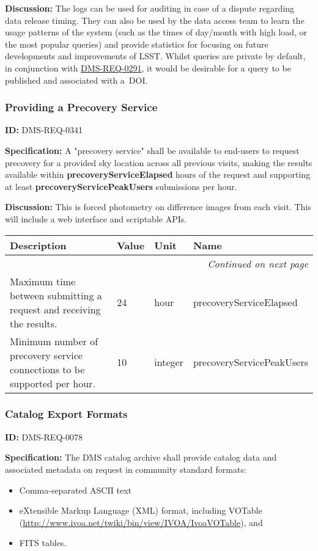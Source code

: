 \documentclass[SE,toc,lsstdraft]{lsstdoc}
\makeatletter
\newcommand{\paramname}[1]{\hspace{0pt}#1}
\newcommand{\unitname}[1]{\hspace{0pt}#1}
\newenvironment{parameters}[0]{%
\setlength\LTleft{0pt}
\setlength\LTright{\fill}
\begin{small}
\begin{longtable}[]{|p{0.5\textwidth}|l|p{0.6in}|p{1.74in}@{}|}

\hline \textbf{Description} & \textbf{Value} & \textbf{Unit} & \textbf{Name} \\ \hline
\endhead

\hline \multicolumn{4}{r}{\emph{Continued on next page}} \\
\endfoot

\hline\hline
\endlastfoot
}{%
\hline
\end{longtable}
\end{small}
}
\makeatother
\begin{document}
    \textbf{Discussion: }The logs can be used for auditing in case of a dispute regarding data release timing. They can also be used by the data access team to learn the usage patterns of the system (such as the times of day/month with high load, or the most popular queries) and provide statistics for focusing on future developments and improvements of LSST. Whilst queries are private by default, in conjunction with \hyperref[DMS-REQ-0291]{DMS-REQ-0291}, it would be desirable for a query to be published and associated with a DOI.




\subsubsection{Providing a Precovery Service}

\label{DMS-REQ-0341}
\textbf{ID:} DMS-REQ-0341

\textbf{Specification:} A "precovery service" shall be available to end-users to request precovery for a provided sky location across all previous visits, making the results available within \textbf{precoveryServiceElapsed} hours of the request and supporting at least\textbf{ precoveryServicePeakUsers} submissions per hour.

\textbf{Discussion:} This is forced photometry on difference images from each visit. This will include a web interface and scriptable APIs.



\begin{parameters}
Maximum time between submitting a request and receiving the results.
&
24
&
\unitname{%
hour
}
&
\paramname{%
precoveryServiceElapsed
} \\\hline
Minimum number of precovery service connections to be supported per hour.
&
10
&
\unitname{%
integer
}
&
\paramname{%
precoveryServicePeakUsers
} \\\hline
\end{parameters}




\subsubsection{Catalog Export Formats}

\label{DMS-REQ-0078}
\textbf{ID:} DMS-REQ-0078

\textbf{Specification:} The DMS catalog archive shall provide catalog data and associated metadata on request in community standard formats:
\begin{itemize}
\item Comma-separated ASCII text
\item eXtensible Markup Language (XML) format, including VOTable
   (\url{http://www.ivoa.net/twiki/bin/view/IVOA/IvoaVOTable}), and
\item FITS tables.
\end{itemize}
\end{document}
